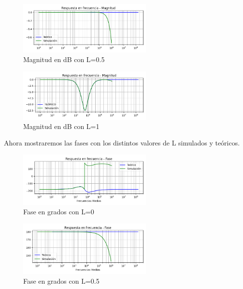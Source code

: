 \begin{figure}[H]
	\centering
	\includegraphics[width=0.6\textwidth]{../Ejercicio4-EcualizadorDeFase/Informe/highFrecL050Mag.png} 
	\caption{Magnitud en dB con L=0.5}
	\label{highMagL05}
\end{figure}

\begin{figure}[H]
	\centering
	\includegraphics[width=0.6\textwidth]{../Ejercicio4-EcualizadorDeFase/Informe/highFrecL100Mag.png} 
	\caption{Magnitud en dB con L=1}
	\label{highMagL10}
\end{figure}


Ahora mostraremos las fases con los distintos valores de L simulados y teóricos.

\begin{figure}[H]
	\centering
	\includegraphics[width=0.6\textwidth]{../Ejercicio4-EcualizadorDeFase/Informe/highFrecL000Fase.png} 
	\caption{Fase en grados con L=0}
	\label{highFaseL00}
\end{figure}
	
\begin{figure}[H]
	\centering
	\includegraphics[width=0.6\textwidth]{../Ejercicio4-EcualizadorDeFase/Informe/highFrecL050Fase.png} 
	\caption{Fase en grados con L=0.5}
	\label{highFaseL05}
\end{figure}

